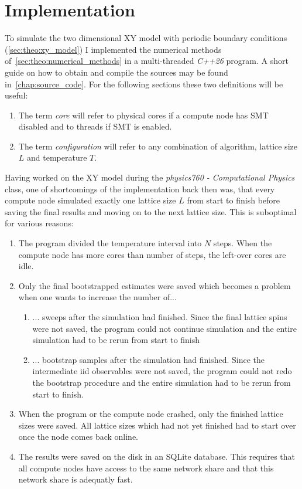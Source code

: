\chapter{Implementation}\label{sec:impl}
	To simulate the two dimensional XY model with periodic boundary conditions (\cref{sec:theo:xy_model}) I implemented the numerical methods of~\cref{sec:theo:numerical_methods} in a multi-threaded \emph{C++26} program. A short guide on how to obtain and compile the sources may be found in~\cref{chap:source_code}. For the following sections these two definitions will be useful:
	\begin{enumerate}
		\item The term \emph{core} will refer to physical cores if a compute node has SMT disabled and to threads if SMT is enabled.
		\item The term \emph{configuration} will refer to any combination of algorithm, lattice size $L$ and temperature $T$.
	\end{enumerate}
	
	Having worked on the XY model during the \emph{physics760 - Computational Physics} class, one of shortcomings of the implementation back then was, that every compute node simulated exactly one lattice size $L$ from start to finish before saving the final results and moving on to the next lattice size. This is suboptimal for various reasons:
	\begin{enumerate}
		\item The program divided the temperature interval into $N$ steps. When the compute node has more cores than number of steps, the left-over cores are idle.
		\item Only the final bootstrapped estimates were saved which becomes a problem when one wants to increase the number of...
		\begin{enumerate}
			\item  ... sweeps after the simulation had finished. Since the final lattice spins were not saved, the program could not continue simulation and the entire simulation had to be rerun from start to finish
			\item ... bootstrap samples after the simulation had finished. Since the intermediate iid observables were not saved, the program could not redo the bootstrap procedure and the entire simulation had to be rerun from start to finish.
		\end{enumerate}
		\item When the program or the compute node crashed, only the finished lattice sizes were saved. All lattice sizes which had not yet finished had to start over once the node comes back online.
		\item The results were saved on the disk in an SQLite database. This requires that all compute nodes have access to the same network share and that this network share is adequatly fast. 
	\end{enumerate}
	
